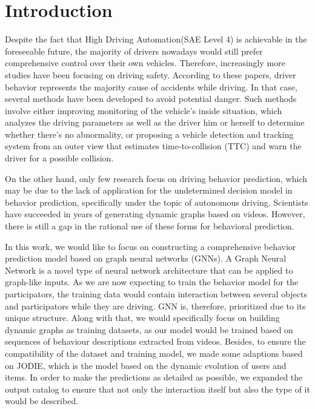 
\chapter{Introduction}\label{chapter:introduction}
Despite the fact that High Driving Automation(SAE Level 4) is achievable in the foreseeable future\cite{inagaki2019critique}, the majority of drivers nowadays would still prefer comprehensive control over their own vehicles. Therefore, increasingly more studies have been focusing on driving safety\cite{lee2005driving,lee2008fifty}. 
According to these papers, driver behavior represents the majority cause of accidents while driving. In that case, several methods have been developed to avoid potential danger. Such methods involve either improving monitoring of the vehicle's inside situation, which analyzes the driving parameters as well as the driver him or herself to determine whether there's no abnormality\cite{karrouchi2023driving}, or proposing a vehicle detection and tracking system from an outer view that estimates time-to-collision (TTC) and warn the driver for a possible collision\cite{aytekin2010increasing}.

On the other hand, only few research focus on driving behavior prediction, which may be due to the lack of application for the undetermined decision model in behavior prediction, specifically under the topic of autonomous driving. Scientists have succeeded in years of generating dynamic graphs based on videos. However, there is still a gap in the rational use of these forms for behavioral prediction.

In this work, we would like to focus on constructing a comprehensive behavior prediction model based on graph neural networks (GNNs). A Graph Neural Network is a novel type of neural network architecture that can be applied to graph-like inputs. As we are now expecting to train the behavior model for the participators, the training data would contain interaction between several objects and participators while they are driving. GNN is, therefore, prioritized due to its unique structure. Along with that, we would specifically focus on building dynamic graphs as training datasets, as our model would be trained based on sequences of behaviour descriptions extracted from videos.
Besides, to ensure the compatibility of the dataset and training model, we made some adaptions based on JODIE\cite{kumar2019predicting}, which is the model based on the dynamic evolution of users and items. In order to make the predictions as detailed as possible, we expanded the output catalog to ensure that not only the interaction itself but also the type of it would be described.

